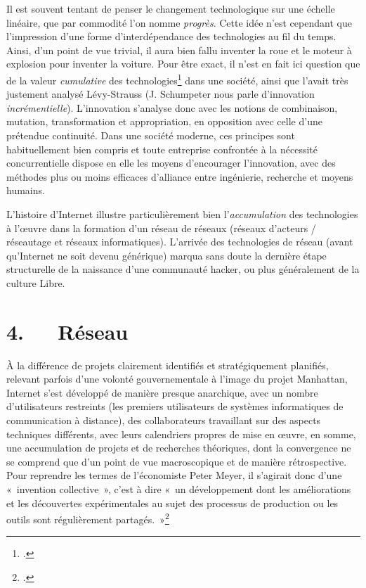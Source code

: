 \documentclass{FramateX}
\begin{document}
\begin{refsection}
Il est souvent tentant de penser le changement technologique sur une
échelle linéaire, que par commodité l'on nomme
\textit{progrès}. Cette idée n'est cependant que
l'impression d'une forme
d'interdépendance des technologies au fil du temps.
Ainsi, d'un point de vue trivial, il aura bien fallu inventer la roue
et le moteur à explosion pour inventer la voiture. Pour être exact, il
n'est en fait ici question que de la valeur
\textit{cumulative} des technologies\footnote{\cite{jacomyage2002}.} dans une société, ainsi que
l'avait très justement analysé Lévy-Strauss (J.
Schumpeter nous parle d'innovation \textit{incrémentielle}).
L'innovation s'analyse donc avec les
notions de combinaison, mutation, transformation et appropriation, en
opposition avec celle d'une prétendue continuité. Dans
une société moderne, ces principes sont habituellement bien compris et
toute entreprise confrontée à la nécessité concurrentielle dispose en
elle les moyens d'encourager
l'innovation, avec des méthodes plus ou moins
efficaces d'alliance entre ingénierie, recherche et
moyens humains.

L'histoire d'Internet illustre
particulièrement bien l'\textit{accumulation} des
technologies à l'œuvre dans la formation d'un réseau
de réseaux (réseaux d'acteurs / réseautage et réseaux
informatiques). L'arrivée des technologies de réseau (avant qu'Internet
ne soit devenu générique) marqua sans doute la dernière étape
structurelle de la naissance d'une communauté hacker, ou plus
généralement de la culture Libre.

\section*{4.~~~Réseau}
{}

À la différence de projets clairement identifiés et stratégiquement
planifiés, relevant parfois d'une volonté
gouvernementale à l'image du projet Manhattan,
Internet s'est développé de manière presque
anarchique, avec un nombre d'utilisateurs restreints
(les premiers utilisateurs de systèmes informatiques de communication à
distance), des collaborateurs travaillant sur des aspects techniques
différents, avec leurs calendriers propres de mise en œuvre, en somme,
une accumulation de projets et de recherches théoriques, dont la
convergence ne se comprend que d'un point de vue
macroscopique et de manière rétrospective. Pour reprendre les termes de
l'économiste Peter Meyer, il
s'agirait donc d'une «~invention
collective~», c'est à dire «~un développement dont les
améliorations et les découvertes expérimentales au sujet des processus
de production ou les outils sont régulièrement
partagés.~»\footnote{\cite{meyerprecision1973}.}


\end{refsection}
\end{document}
